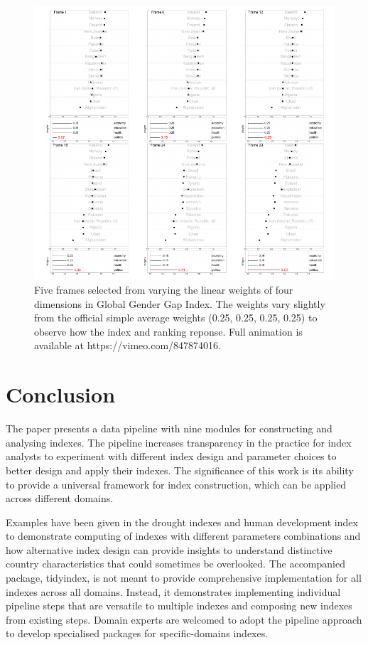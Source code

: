 \documentclass[
]{interact}
\begin{document}
\begin{figure}

{\centering \includegraphics{tidyindex_files/figure-pdf/fig-idx-tour-1.pdf}

}

\caption{\label{fig-idx-tour}Five frames selected from varying the
linear weights of four dimensions in Global Gender Gap Index. The
weights vary slightly from the official simple average weights (0.25,
0.25, 0.25, 0.25) to observe how the index and ranking reponse. Full
animation is available at https://vimeo.com/847874016.}

\end{figure}

\hypertarget{conclusion}{%
\section{Conclusion}\label{conclusion}}

The paper presents a data pipeline with nine modules for constructing
and analysing indexes. The pipeline increases transparency in the
practice for index analysts to experiment with different index design
and parameter choices to better design and apply their indexes. The
significance of this work is its ability to provide a universal
framework for index construction, which can be applied across different
domains.

Examples have been given in the drought indexes and human development
index to demonstrate computing of indexes with different parameters
combinations and how alternative index design can provide insights to
understand distinctive country characteristics that could sometimes be
overlooked. The accompanied package, tidyindex, is not meant to provide
comprehensive implementation for all indexes across all domains.
Instead, it demonstrates implementing individual pipeline steps that are
versatile to multiple indexes and composing new indexes from existing
steps. Domain experts are welcomed to adopt the pipeline approach to
develop specialised packages for specific-domains indexes.
\end{document}
